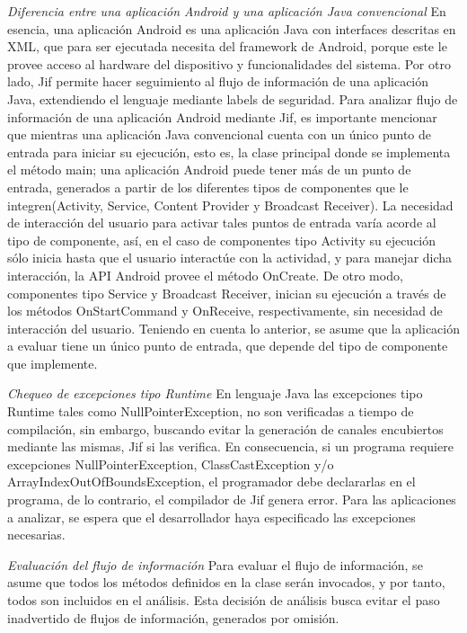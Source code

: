 \textit{Diferencia entre una aplicación Android y una aplicación Java
convencional}\newline 
En esencia, una aplicación Android es una aplicación Java con interfaces
descritas en XML, que para ser ejecutada necesita del framework de Android,
porque este le provee acceso al hardware del dispositivo y funcionalidades del
sistema.\newline 
Por otro lado, Jif permite hacer seguimiento al flujo de información de una
aplicación Java, extendiendo el lenguaje mediante labels de seguridad.\newline
Para analizar flujo de información de una aplicación Android mediante
Jif, es importante mencionar que mientras una aplicación Java convencional
cuenta con un único punto de entrada para iniciar su ejecución, esto es, la
clase principal donde se implementa el método main; una aplicación Android puede
tener más de un punto de entrada, generados a partir de los diferentes tipos de
componentes que le integren(Activity, Service, Content Provider y Broadcast
Receiver). La necesidad de interacción del usuario para activar tales puntos de
entrada varía acorde al tipo de componente, así, en el caso de componentes tipo
Activity su ejecución sólo inicia hasta que el usuario interactúe con la
actividad, y para manejar dicha interacción, la API Android provee el método
OnCreate. De otro modo, componentes tipo Service y Broadcast Receiver, inician
su ejecución a través de los métodos OnStartCommand y OnReceive,
respectivamente, sin necesidad de interacción del usuario.\newline 
{ \color{black} {Teniendo en cuenta lo anterior, se asume que la aplicación a
evaluar tiene un único punto de entrada, que depende del tipo de componente que
implemente.} }

\textit{Chequeo de excepciones tipo Runtime}\newline
En lenguaje Java las excepciones tipo Runtime tales como NullPointerException, no
son verificadas a tiempo de compilación, sin embargo, buscando evitar la
generación de canales encubiertos mediante las mismas, Jif si las verifica. 
En consecuencia, si un programa requiere excepciones NullPointerException,
ClassCastException y/o ArrayIndexOutOfBoundsException, el programador debe
declararlas en el programa, de lo contrario, el compilador de Jif genera error.
Para las aplicaciones a analizar, se espera que el desarrollador haya
especificado las excepciones necesarias.

\textit{Evaluación del flujo de información}\newline
Para evaluar el flujo de información, se asume que todos los métodos definidos
en la clase serán invocados, y por tanto, todos son incluidos en el análisis.\newline 
Esta decisión de análisis busca evitar el paso inadvertido de flujos de
información, generados por omisión.

